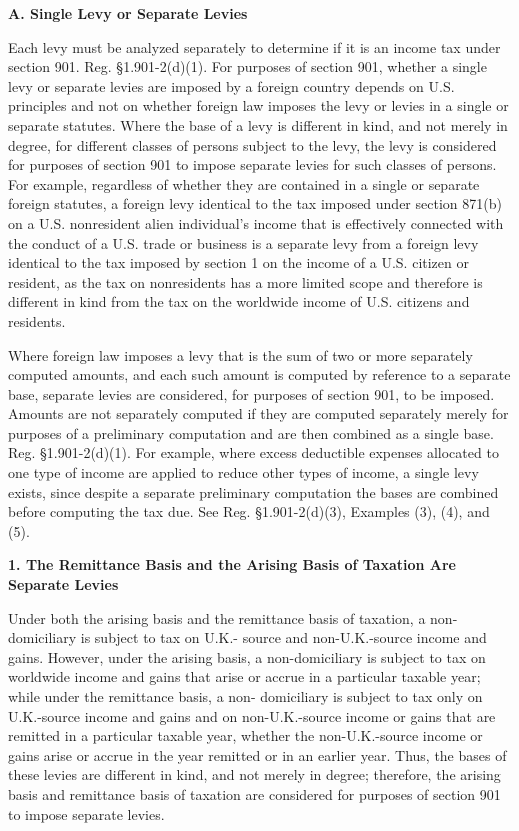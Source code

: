 \begin{select}
\begin{center}
\textbf{A. Single Levy or Separate Levies}
\end{center}

Each levy must be analyzed separately to determine if it is an income tax under section 901. Reg. \S1.901-2(d)(1). For purposes of section 901, whether a single levy or separate levies are imposed by a foreign country depends on U.S. principles and not on whether foreign law imposes the levy or levies in a single or separate statutes. Where the base of a levy is different in kind, and not merely in degree, for different classes of persons subject to the levy, the levy is considered for purposes of section 901 to impose separate levies for such classes of persons. For example, regardless of whether they are contained in a single or separate foreign statutes, a foreign levy identical to the tax imposed under section 871(b) on a U.S. nonresident alien individual's income that is effectively connected with the conduct of a U.S. trade or business is a separate levy from a foreign levy identical to the tax imposed by section 1 on the income of a U.S. citizen or resident, as the tax on nonresidents has a more limited scope and therefore is different in kind from the tax on the worldwide income of U.S. citizens and residents.

Where foreign law imposes a levy that is the sum of two or more separately computed amounts, and each such amount is computed by reference to a separate base, separate levies are considered, for purposes of section 901, to be imposed. Amounts are not separately computed if they are computed separately merely for purposes of a preliminary computation and are then combined as a single base. Reg. \S1.901-2(d)(1). For example, where excess deductible expenses allocated to one type of income are applied to reduce other types of income, a single levy exists, since despite a separate preliminary computation the bases are combined before computing the tax due. See  Reg. \S1.901-2(d)(3), Examples (3), (4), and (5).

\begin{center}
\textbf{1. The Remittance Basis and the Arising Basis of Taxation Are Separate Levies}
\end{center}

Under both the arising basis and the remittance basis of taxation, a non-domiciliary is subject to tax on U.K.- source and non-U.K.-source income and gains. However, under the arising basis, a non-domiciliary is subject to tax on worldwide income and gains that arise or accrue in a particular taxable year; while under the remittance basis, a non- domiciliary is subject to tax only on U.K.-source income and gains and on non-U.K.-source income or gains that are remitted in a particular taxable year, whether the non-U.K.-source income or gains arise or accrue in the year remitted or in an earlier year. Thus, the bases of these levies are different in kind, and not merely in degree; therefore, the arising basis and remittance basis of taxation are considered for purposes of section 901 to impose separate levies.


\end{select}
